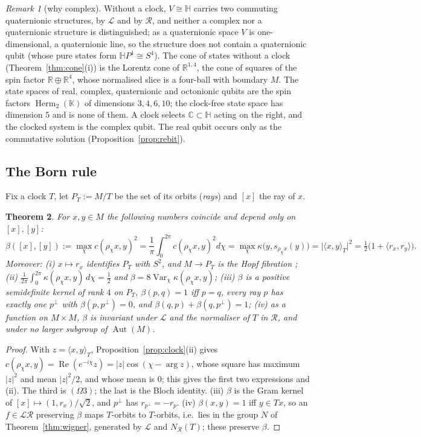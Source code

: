 \documentclass[aps,pra,onecolumn,superscriptaddress,nofootinbib,10pt]{revtex4-2}
\newtheorem{theorem}{Theorem}
\theoremstyle{definition}
\theoremstyle{remark}
\newtheorem{remark}[theorem]{Remark}
\newcommand{\R}{\mathbb{R}}
\newcommand{\C}{\mathbb{C}}
\newcommand{\HH}{\mathbb{H}}
\newcommand{\cL}{\mathcal{L}}
\newcommand{\cR}{\mathcal{R}}
\newcommand{\Aut}{\operatorname{Aut}}
\newcommand{\re}{\operatorname{Re}}
\newcommand{\Var}{\operatorname{Var}}
\newcommand{\Herm}{\operatorname{Herm}}
\newcommand{\ip}[2]{\langle #1,#2\rangle}
\begin{document}
\begin{remark}[why complex]\label{rem:complex}
Without a clock, $V\cong\HH$ carries two commuting quaternionic structures, by $\cL$ and by $\cR$, and
neither a complex nor a quaternionic structure is distinguished; as a quaternionic space $V$ is one-dimensional, a
quaternionic line, so the structure does not contain a quaternionic qubit (whose pure states form
$\HH P^1\cong S^4$).  The cone of states without a clock (Theorem~\ref{thm:cone}(i)) is the Lorentz
cone of $\R^{1,4}$, the cone of squares of the spin factor $\R\oplus\R^4$, whose normalised slice is
a four-ball with boundary $M$.  The state spaces of real, complex, quaternionic and octonionic qubits
are the spin factors $\Herm_2(\mathbb K)$ of dimensions $3,4,6,10$; the clock-free state space has
dimension $5$ and is none of them.  A clock selects $\C\subset\HH$ acting on the right, and the clocked
system is the complex qubit.  The real qubit occurs only as the commutative solution
(Proposition~\ref{prop:rebit}).
\end{remark}

\subsection{The Born rule}
Fix a clock $T$, let $P_T:=M/T$ be the set of its orbits (\emph{rays}) and $[x]$ the ray of $x$.

\begin{theorem}\label{thm:born}
For $x,y\in M$ the following numbers coincide and depend only on $[x],[y]$:
\[
\beta([x],[y]):=\max_{\chi}c(\rho_\chi x,y)^2=\frac1\pi\int_0^{2\pi}\!c(\rho_\chi x,y)^2d\chi
=\max_\chi\kappa\bigl(y,s_{\rho_\chi x}(y)\bigr)=\lvert\ip{x}{y}_T\rvert^2=\tfrac12\bigl(1+\ip{r_x}{r_y}\bigr).
\]
Moreover: (i) $x\mapsto r_x$ identifies $P_T$ with $S^2$, and $M\to P_T$ is the Hopf fibration \cite{Hopf};
(ii) $\frac1{2\pi}\int_0^{2\pi}\kappa(\rho_\chi x,y)\,d\chi=\tfrac12$ and $\beta=8\Var_\chi\kappa(\rho_\chi x,y)$;
(iii) $\beta$ is a positive semidefinite kernel of rank $4$ on $P_T$, $\beta(p,q)=1$ iff $p=q$, every
ray $p$ has exactly one $p^\perp$ with $\beta(p,p^\perp)=0$, and $\beta(q,p)+\beta(q,p^\perp)=1$;
(iv) as a function on $M\times M$, $\beta$ is invariant under $\cL$ and the normaliser of $T$ in $\cR$,
and under no larger subgroup of $\Aut(M)$.
\end{theorem}
\begin{proof}
With $z=\ip{x}{y}_T$, Proposition~\ref{prop:clock}(ii) gives $c(\rho_\chi x,y)=\re(e^{-i\chi}z)
=\lvert z\rvert\cos(\chi-\arg z)$, whose square has maximum $\lvert z\rvert^2$ and mean $\lvert z\rvert^2/2$, and
whose mean is $0$; this gives the first two expressions and (ii).  The third is $(\Omega3)$; the last
is the Bloch identity.  (iii) $\beta$ is the Gram kernel of $[x]\mapsto(1,r_x)/\sqrt2$, and $p^\perp$
has $r_{p^\perp}=-r_p$.  (iv) $\beta(x,y)=1$ iff $y\in Tx$, so an $f\in\cL\cR$ preserving $\beta$ maps
$T$-orbits to $T$-orbits, i.e.\ lies in the group $N$ of Theorem~\ref{thm:wigner}, generated by $\cL$
and $N_\cR(T)$; these preserve $\beta$.
\end{proof}
\end{document}
